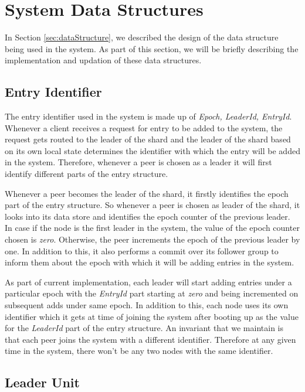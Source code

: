 \documentclass[a4paper,11pt]{kth-mag}
\begin{document}
\section{System Data Structures}

In Section \ref{sec:dataStructure}, we described the design of the data structure being used in the system. As part of this section, we will be briefly describing the implementation and updation of these data structures.


\subsection{Entry Identifier}
\label{ssec:entryIdStructure}

The entry identifier used in the system is made up of \textit{Epoch, LeaderId, EntryId}. Whenever a client receives a request for entry to be added to the system, the request gets routed to the leader of the shard and the leader of the shard based on its own local state determines the identifier with which the entry will be added in the system. Therefore, whenever a peer is chosen as a leader it will first identify different parts of the entry structure.
\par Whenever a peer becomes the leader of the shard, it firstly identifies the epoch part of the entry structure. So whenever a peer is chosen as leader of the shard, it looks into its data store and identifies the epoch counter of the previous leader. In case if the node is the first leader in the system, the value of the epoch counter chosen is \textit{zero}. Otherwise, the peer increments the epoch of the previous leader by one. In addition to this, it also performs a commit over its follower group to inform them about the epoch with which it will be adding entries in the system.
\par As part of current implementation, each leader will start adding entries under a particular epoch with the \textit{EntryId} part starting at \textit{zero} and being incremented on subsequent adds under same epoch. In addition to this, each node uses its own identifier which it gets at time of joining the system after booting up as the value for the \textit{LeaderId} part of the entry structure.  An invariant that we maintain is that each peer joins the system with a different identifier. Therefore at any given time in the system, there won't be any two nodes with the same  identifier.

\subsection{Leader Unit}
\label{ssec:leaderUnit}
\end{document}
